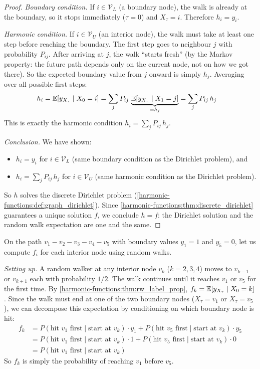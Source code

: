 \begin{notechapter}
\begin{proof}
\emph{Boundary condition.} If $i \in \mathcal{V}_L$ (a boundary node),
the walk is already at the boundary, so it stops immediately ($\tau = 0$)
and $X_\tau = i$. Therefore $h_i = y_i$.

\emph{Harmonic condition.} If $i \in \mathcal{V}_U$ (an interior node),
the walk must take at least one step before reaching the boundary. The
first step goes to neighbour $j$ with probability $P_{ij}$. After arriving
at $j$, the walk ``starts fresh'' (by the Markov property: the future path
depends only on the current node, not on how we got there). So the expected
boundary value from $j$ onward is simply $h_j$. Averaging over all possible
first steps:
\begin{align}
h_i &= \mathbb{E}[y_{X_\tau} \mid X_0 = i]
= \sum_j P_{ij}\,\underbrace{\mathbb{E}[y_{X_\tau} \mid X_1 = j]}_{= h_j}
= \sum_j P_{ij}\,h_j
\end{align}
This is exactly the harmonic condition
$h_i = \sum_j P_{ij}\,h_j$.

\emph{Conclusion.} We have shown:
\begin{itemize}
    \item $h_i = y_i$ for $i \in \mathcal{V}_L$ (same boundary condition
          as the Dirichlet problem), and
    \item $h_i = \sum_j P_{ij}\,h_j$ for $i \in \mathcal{V}_U$ (same
          harmonic condition as the Dirichlet problem).
\end{itemize}
So $h$ solves the discrete Dirichlet problem
(\cref{harmonic-functions:def:graph_dirichlet}). Since
\cref{harmonic-functions:thm:discrete_dirichlet} guarantees a unique solution $f$, we
conclude $h = f$: the Dirichlet solution and the random walk expectation
are one and the same.
\end{proof}

\begin{example}
On the path $v_1 - v_2 - v_3 - v_4 - v_5$ with boundary values
$y_1 = 1$ and $y_5 = 0$, let us compute $f_i$ for each interior node
using random walks.

\emph{Setting up.} A random walker at any interior node $v_k$
($k = 2, 3, 4$) moves to $v_{k-1}$ or $v_{k+1}$ each with probability
$1/2$. The walk continues until it reaches $v_1$ or $v_5$ for the first
time. By \cref{harmonic-functions:thm:rw_label_prop},
$f_k = \mathbb{E}[y_{X_\tau} \mid X_0 = k]$. Since the walk must end at one of the
two boundary nodes ($X_\tau = v_1$ or $X_\tau = v_5$), we can decompose this
expectation by conditioning on which boundary node is hit:
\begin{align*}
f_k &= P(\text{hit } v_1 \text{ first} \mid \text{start at } v_k)
  \cdot y_1
  + P(\text{hit } v_5 \text{ first} \mid \text{start at } v_k)
  \cdot y_5 \\
&= P(\text{hit } v_1 \text{ first} \mid \text{start at } v_k)
  \cdot 1
  + P(\text{hit } v_5 \text{ first} \mid \text{start at } v_k)
  \cdot 0 \\
&= P(\text{hit } v_1 \text{ first} \mid \text{start at } v_k)
\end{align*}
So $f_k$ is simply the probability of reaching $v_1$ before $v_5$.


\end{example}
\end{notechapter}
